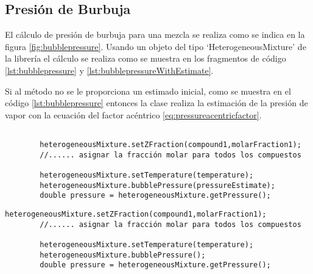 \subsection{Presión de Burbuja}\label{subsec:bubblepressure}

	El cálculo de presión de burbuja para una mezcla se realiza como se indica en la figura \ref{fig:bubblepressure}. Usando un objeto del tipo `HeterogeneousMixture' de la librería \Materia el cálculo se realiza como se muestra en los fragmentos de código \ref{lst:bubblepressure} y \ref{lst:bubblepressureWithEstimate}.

	Si al método no se le proporciona un estimado inicial, como se muestra en el código \ref{lst:bubblepressure} entonces la clase realiza la estimación de la presión de vapor con la ecuación del factor acéntrico \ref{eq:pressureacentricfactor}. 



	\begin{lstlisting}[label={lst:bubblepressureWithEstimate},caption={Cálculo de la presión de burbuja proporcionando un estimado inicial.}]

		heterogeneousMixture.setZFraction(compound1,molarFraction1);
		//...... asignar la fracción molar para todos los compuestos

		heterogeneousMixture.setTemperature(temperature);
		heterogeneousMixture.bubblePressure(pressureEstimate);
		double pressure = heterogeneousMixture.getPressure();
	\end{lstlisting}


	\begin{lstlisting}[label={lst:bubblepressure},caption={Cálculo de la presión de burbuja.}]
		heterogeneousMixture.setZFraction(compound1,molarFraction1);
		//...... asignar la fracción molar para todos los compuestos

		heterogeneousMixture.setTemperature(temperature);
		heterogeneousMixture.bubblePressure();
		double pressure = heterogeneousMixture.getPressure();
	\end{lstlisting}

